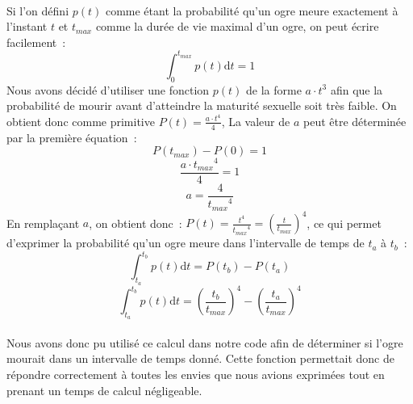 \paragraph{}
Si l'on défini $p(t)$ comme étant la probabilité qu'un ogre meure exactement
à l'instant $t$ et $t_{max}$ comme la durée de vie maximal d'un ogre, on
peut écrire facilement~:
$$\int_0^{t_{max}} p(t) \mathrm dt = 1$$
Nous avons décidé d'utiliser une fonction $p(t)$ de la forme $a \cdot t^3$
afin que la probabilité de mourir avant d'atteindre la maturité sexuelle soit
très faible. On obtient donc comme primitive $P(t) = \frac{a \cdot t^4}{4}$,
La valeur de $a$ peut être déterminée par la première équation~:
$$P(t_{max}) - P(0) = 1$$
$$\frac{a \cdot {t_{max}}^4}{4} = 1$$
$$ a = \frac{4}{{t_{max}}^4}$$
En remplaçant $a$, on obtient donc~:
$P(t) = \frac{t^4}{{t_{max}}^4} = \left ( \frac{t}{t_{max}} \right ) ^4$, ce qui
permet d'exprimer la probabilité qu'un ogre meure dans l'intervalle de temps
de $t_a$ à $t_b$~:
$$\int_{t_a}^{t_b} p(t) \mathrm dt = P(t_b) - P(t_a)$$
$$\int_{t_a}^{t_b} p(t) \mathrm dt = \left ( \frac{t_b}{t_{max}} \right ) ^4 - \left ( \frac{t_a}{t_{max}} \right ) ^4$$

\paragraph{}
Nous avons donc pu utilisé ce calcul dans notre code afin de déterminer si
l'ogre mourait dans un intervalle de temps donné. Cette fonction permettait
donc de répondre correctement à toutes les envies que nous avions exprimées
tout en prenant un temps de calcul négligeable.
